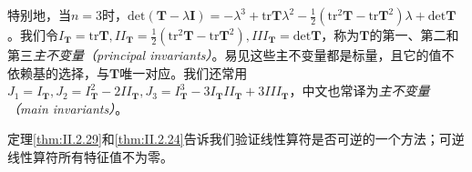 \documentclass[main.tex]{subfiles}
\begin{document}
特别地，当$n=3$时，$\mathrm{det}\left(\mathbf{T}-\lambda\mathbf{I}\right)=-\lambda^3+\mathrm{tr}\mathbf{T}\lambda^2-\frac{1}{2}\left(\mathrm{tr}^2\mathbf{T}-\mathrm{tr}\mathbf{T}^2\right)\lambda+\mathrm{det}\mathbf{T}$。我们令$I_\mathbf{T}=\mathrm{tr}\mathbf{T},II_\mathbf{T}=\frac{1}{2}\left(\mathrm{tr}^2\mathbf{T}-\mathrm{tr}\mathbf{T}^2\right),III_\mathbf{T}=\mathrm{det}\mathbf{T}$，称为$\mathbf{T}$的第一、第二和第三\emph{主不变量（principal invariants）}。易见这些主不变量都是标量，且它的值不依赖基的选择，与$\mathbf{T}$唯一对应。我们还常用$J_1=I_\mathbf{T},J_2=I_\mathbf{T}^2-2II_\mathbf{T},J_3=I_\mathbf{T}^3-3I_\mathbf{T}II_\mathbf{T}+3III_\mathbf{T}$，中文也常译为\emph{主不变量（main invariants）}。

定理\ref{thm:II.2.29}和\ref{thm:II.2.24}告诉我们验证线性算符是否可逆的一个方法；可逆线性算符所有特征值不为零。
\end{document}
